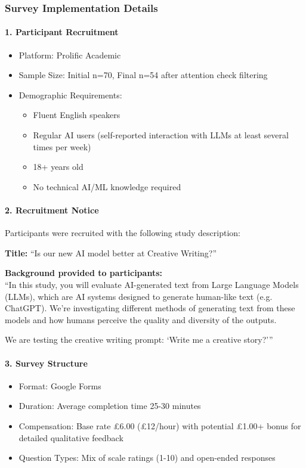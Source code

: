 \documentclass{article}
\begin{document}
\subsubsection{Survey Implementation Details}

\paragraph{1. Participant Recruitment}
\begin{itemize}
    \item Platform: Prolific Academic
    \item Sample Size: Initial n=70, Final n=54 after attention check filtering
    \item Demographic Requirements:
    \begin{itemize}
        \item Fluent English speakers
        \item Regular AI users (self-reported interaction with LLMs at least several times per week)
        \item 18+ years old
        \item No technical AI/ML knowledge required
    \end{itemize}
\end{itemize}

\paragraph{2. Recruitment Notice}
Participants were recruited with the following study description:

\noindent\textbf{Title:} ``Is our new AI model better at Creative Writing?''

\noindent\textbf{Background provided to participants:}\\
``In this study, you will evaluate AI-generated text from Large Language Models (LLMs), which are AI systems designed to generate human-like text (e.g. ChatGPT). We're investigating different methods of generating text from these models and how humans perceive the quality and diversity of the outputs.

We are testing the creative writing prompt: `Write me a creative story?'''

\paragraph{3. Survey Structure}
\begin{itemize}
    \item Format: Google Forms
    \item Duration: Average completion time 25-30 minutes
    \item Compensation: Base rate £6.00 (£12/hour) with potential £1.00+ bonus for detailed qualitative feedback
    \item Question Types: Mix of scale ratings (1-10) and open-ended responses
\end{itemize}
\end{document}
